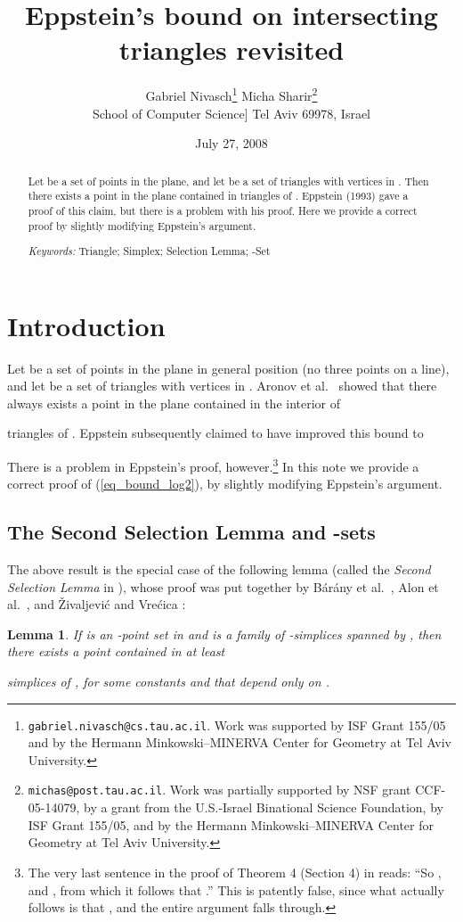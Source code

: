 \documentclass[11pt]{article}
\author{Gabriel Nivasch\thanks{\texttt{gabriel.nivasch@cs.tau.ac.il}.
Work was supported by ISF Grant 155/05 and by the Hermann
Minkowski--MINERVA Center for Geometry at Tel Aviv University.}
\quad Micha Sharir\thanks{\texttt{michas@post.tau.ac.il}. Work was
partially supported by NSF grant CCF-05-14079, by a grant from the
U.S.-Israel Binational Science Foundation, by ISF Grant 155/05, and
by the Hermann Minkowski--MINERVA Center for Geometry
at Tel Aviv University.}\\
\footnotesize School of Computer Science\-1mm]
\footnotesize Tel Aviv 69978, Israel}
\date{July 27, 2008}
\title{Eppstein's bound on intersecting triangles revisited}
\newtheorem{lemma}{Lemma}
\begin{document}
\maketitle

\begin{abstract}
Let  be a set of  points in the plane, and let  be a set of
 triangles with vertices in . Then there exists a point in the
plane contained in  triangles of .
Eppstein (1993) gave a proof of this claim, but there is a problem
with his proof. Here we provide a correct proof by slightly
modifying Eppstein's argument.

\emph{Keywords:} Triangle; Simplex; Selection Lemma; -Set
\end{abstract}

\section{Introduction}

Let  be a set of  points in the plane in general position (no
three points on a line), and let  be a set of  triangles with vertices in . Aronov et al.~\cite{ACEGSW}
showed that there always exists a point in the plane contained in
the interior of

triangles of . Eppstein \cite{eppstein} subsequently claimed to
have improved this bound to

There is a problem in Eppstein's proof, however.\footnote{The very
last sentence in the proof of Theorem 4 (Section 4) in
\cite{eppstein} reads: ``So , and , from which it follows that .'' This is patently false, since what actually follows is
that , and the entire argument falls through.}
In this note we provide a correct proof of (\ref{eq_bound_log2}), by
slightly modifying Eppstein's argument.

\subsection{The Second Selection Lemma and -sets}

The above result is the special case  of the following lemma
(called the \emph{Second Selection Lemma} in \cite{matou}), whose
proof was put together by B\'ar\'any et al.~\cite{BFL}, Alon et
al.~\cite{ABFK}, and \v Zivaljevi\'c and Vre\'cica \cite{ZV}:

\begin{lemma}\label{lemma_2nd_sel}
If  is an -point set in  and  is a family of
 -simplices spanned by , then there
exists a point  contained in at least

simplices of , for some constants  and  that depend
only on .
\end{lemma}
\end{document}
